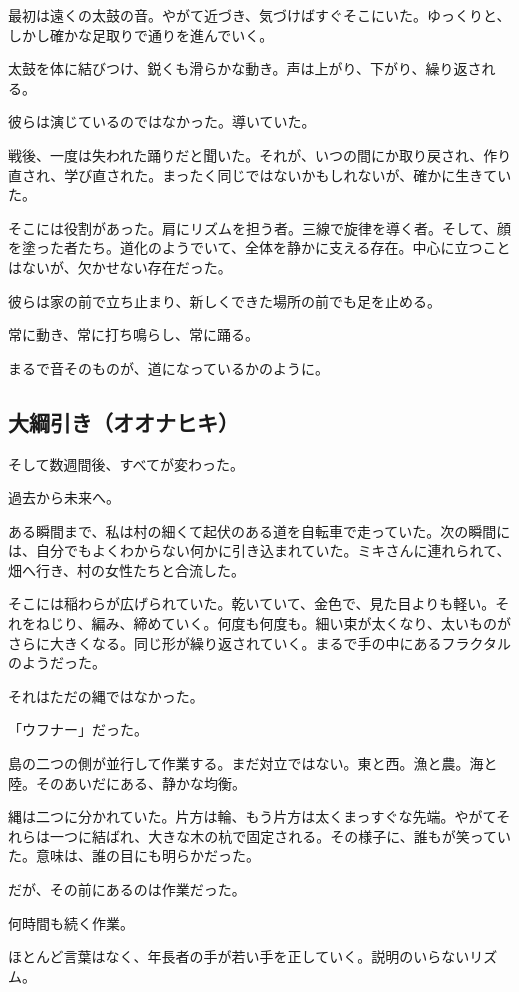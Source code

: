 \documentclass[
  letterpaper,
  oneside]{scrbook}
\begin{document}
最初は遠くの太鼓の音。やがて近づき、気づけばすぐそこにいた。ゆっくりと、しかし確かな足取りで通りを進んでいく。

太鼓を体に結びつけ、鋭くも滑らかな動き。声は上がり、下がり、繰り返される。

彼らは演じているのではなかった。導いていた。

戦後、一度は失われた踊りだと聞いた。それが、いつの間にか取り戻され、作り直され、学び直された。まったく同じではないかもしれないが、確かに生きていた。

そこには役割があった。肩にリズムを担う者。三線で旋律を導く者。そして、顔を塗った者たち。道化のようでいて、全体を静かに支える存在。中心に立つことはないが、欠かせない存在だった。

彼らは家の前で立ち止まり、新しくできた場所の前でも足を止める。

常に動き、常に打ち鳴らし、常に踊る。

まるで音そのものが、道になっているかのように。

\subsection{大綱引き（オオナヒキ）}\label{ux5927ux7db1ux5f15ux304dux30aaux30aaux30caux30d2ux30ad}

そして数週間後、すべてが変わった。

過去から未来へ。

ある瞬間まで、私は村の細くて起伏のある道を自転車で走っていた。次の瞬間には、自分でもよくわからない何かに引き込まれていた。ミキさんに連れられて、畑へ行き、村の女性たちと合流した。

そこには稲わらが広げられていた。乾いていて、金色で、見た目よりも軽い。それをねじり、編み、締めていく。何度も何度も。細い束が太くなり、太いものがさらに大きくなる。同じ形が繰り返されていく。まるで手の中にあるフラクタルのようだった。

それはただの縄ではなかった。

「ウフナー」だった。

島の二つの側が並行して作業する。まだ対立ではない。東と西。漁と農。海と陸。そのあいだにある、静かな均衡。

縄は二つに分かれていた。片方は輪、もう片方は太くまっすぐな先端。やがてそれらは一つに結ばれ、大きな木の杭で固定される。その様子に、誰もが笑っていた。意味は、誰の目にも明らかだった。

だが、その前にあるのは作業だった。

何時間も続く作業。

ほとんど言葉はなく、年長者の手が若い手を正していく。説明のいらないリズム。
\end{document}
